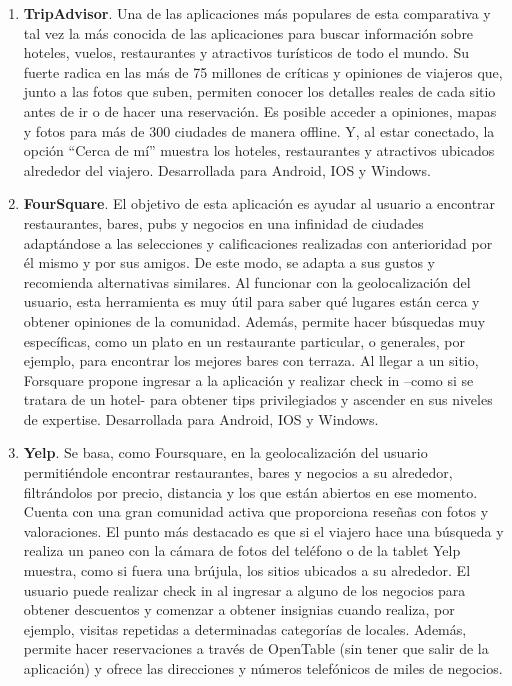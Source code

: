 \begin{enumerate}
	\item \textbf{TripAdvisor}. Una de las aplicaciones más populares de esta comparativa y tal vez la más conocida de las aplicaciones para buscar información sobre hoteles, vuelos, restaurantes y atractivos turísticos de todo el mundo. Su fuerte radica en las más de 75 millones de críticas y opiniones de viajeros que, junto a las fotos que suben, permiten conocer los detalles reales de cada sitio antes de ir o de hacer una reservación. Es posible acceder a opiniones, mapas y fotos para más de 300 ciudades de manera offline. Y, al estar conectado, la opción “Cerca de mí” muestra los hoteles, restaurantes y atractivos ubicados alrededor del viajero. Desarrollada para Android, IOS y Windows.
	
	\item \textbf{FourSquare}. El objetivo de esta aplicación es ayudar al usuario a encontrar restaurantes, bares, pubs y negocios en una infinidad de ciudades adaptándose a las selecciones y calificaciones realizadas con anterioridad por él mismo y por sus amigos. De este modo, se adapta a sus gustos y recomienda alternativas similares. Al funcionar con la geolocalización del usuario, esta herramienta es muy útil para saber qué lugares están cerca y obtener opiniones de la comunidad. Además, permite hacer búsquedas muy específicas, como un plato en un restaurante particular, o generales, por ejemplo, para encontrar los mejores bares con terraza. Al llegar a un sitio, Forsquare propone ingresar a la aplicación y realizar check in –como si se tratara de un hotel- para obtener tips privilegiados y ascender en sus niveles de expertise. Desarrollada para Android, IOS y Windows.
	
	\item  \textbf{Yelp}. Se basa, como Foursquare, en la geolocalización del usuario permitiéndole encontrar restaurantes, bares y negocios a su alrededor, filtrándolos por precio, distancia y los que están abiertos en ese momento. Cuenta con una gran comunidad activa que proporciona reseñas con fotos y valoraciones. El punto más destacado es que si el viajero hace una búsqueda y realiza un paneo con la cámara de fotos del teléfono o de la tablet Yelp muestra, como si fuera una brújula, los sitios ubicados a su alrededor. El usuario puede realizar check in al ingresar a alguno de los negocios para obtener descuentos y comenzar a obtener insignias cuando realiza,  por ejemplo, visitas repetidas a determinadas categorías de locales. Además, permite hacer reservaciones a través de OpenTable (sin tener que salir de la aplicación) y ofrece las direcciones y números telefónicos de miles de negocios.
\end{enumerate}

